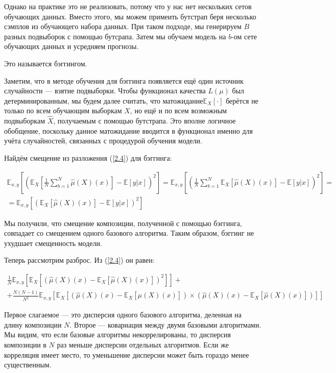 \documentclass{article}
\begin{document}
Однако на практике это не реализовать, потому что у нас нет нескольких сетов обучающих данных. Вместо этого, мы можем примеить бутстрап беря несколько сэмплов из обучающего набора данных. При таком подходе, мы генерируем $B$ разных подвыборок с помощью бутсрапа. Затем мы обучаем модель на $b$-ом сете обучающих данных и усредняем прогнозы.

Это называется бэггингом.

Заметим, что в методе обучения для бэггинга появляется ещё один источник случайности — взятие подвыборки. Чтобы функционал качества $L(\mu)$ был детерминированным, мы будем далее считать, что матожидание$ \mathbb{E}_X [\cdot]$ берётся не только по всем обучающим выборкам $ X$, но ещё и по всем возможным подвыборкам $\hat{X}$, получаемым с помощью бутстрапа. Это вполне логичное обобщение, поскольку данное матожидание вводится в функционал именно для учёта случайностей, связанных с процедурой обучения модели.

Найдём смещение из разложения (\ref{2.4}) для бэггинга:

\begin{multline}
	\mathbb{E}_{x,y}\left[\left(\mathbb{E}_X\left[\frac{1}{N}\sum_{b=1}^{N}\hat{\mu}(X)(x)\right]-\mathbb{E}[y|x]\right)^2\right] = \mathbb{E}_{x,y}\left[\left(\frac{1}{N}\sum_{b=1}^{N}\mathbb{E}_X[\hat{\mu}(X)(x)] - \mathbb{E}[y|x]\right)^2\right] = \\ =\mathbb{E}_{x,y}\left[(\mathbb{E}_X\left[\hat{\mu}(X)(x)\right]-\mathbb{E}[y|x])^2\right]
\end{multline}


Мы получили, что смещение композиции, полученной с помощью бэггинга, совпадает со смещением одного базового алгоритма. Таким образом, бэггинг не ухудшает смещенность модели.

Теперь рассмотрим разброс. Из (\ref{2.4}) он равен:

\begin{multline}
	\frac{1}{N}\mathbb{E}_{x,y}\left[\mathbb{E}_X\left[\left(\hat{\mu}(X)(x)-\mathbb{E}_X[\hat{\mu}(X)(x)]\right)^2\right]\right] + \\ + 
	\frac{N(N-1)}{N^2}\mathbb{E}_{x,y}\left[\mathbb{E}_X\left[\left(\hat{\mu}(X)(x)-\mathbb{E}_X[\hat{\mu}(X)(x)]\right)\times \left(\hat{\mu}(X)(x)-\mathbb{E}_X[\hat{\mu}(X)(x)]\right)\right]\right]
\end{multline}

Первое слагаемое — это дисперсия одного базового алгоритма, деленная на длину композиции $N.$ Второе --- ковариация между двумя базовыми алгоритмами. Мы видим, что если базовые алгоритмы некоррелированы, то дисперсия композиции в $N$ раз меньше дисперсии отдельных алгоритмов. Если же корреляция имеет место, то уменьшение дисперсии может быть гораздо менее существенным.
\end{document}
